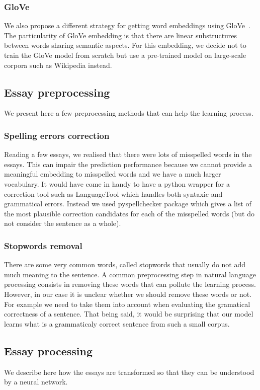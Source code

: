 \documentclass[a4paper,12pt,english]{article}
\begin{document}
\subsubsection{GloVe}
We also propose a different strategy for getting word embeddings using GloVe~\cite{pennington2014glove}.
The particularity of GloVe embedding is that there are linear substructures between words sharing semantic aspects.
For this embedding, we decide not to train the GloVe model from scratch but use a pre-trained model on large-scale corpora such as Wikipedia instead.

\subsection{Essay preprocessing}
We present here a few preprocessing methods that can help the learning process.
\subsubsection{Spelling errors correction}
Reading a few essays, we realised that there were lots of misspelled words in the essays.
This can impair the prediction performance because we cannot provide a meaningful embedding to misspelled words and we have a much larger vocabulary.
It would have come in handy to have a python wrapper for a correction tool such as LanguageTool which handles both syntaxic and grammatical errors.
Instead we used pyspellchecker package which gives a list of the most plausible correction candidates for each of the misspelled words (but do not consider the sentence as a whole).
\subsubsection{Stopwords removal}
There are some very common words, called stopwords that usually do not add much meaning to the sentence.
A common preprocessing step in natural language processing consists in removing these words that can pollute the learning process.
However, in our case it is unclear whether we should remove these words or not.
For example we need to take them into account when evaluating the gramatical correctness of a sentence.
That being said, it would be surprising that our model learns what is a grammaticaly correct sentence from such a small corpus.

\subsection{Essay processing}
We describe here how the essays are transformed so that they can be understood by a neural network.
\end{document}
